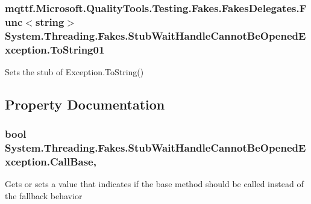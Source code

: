 \hypertarget{class_system_1_1_threading_1_1_fakes_1_1_stub_wait_handle_cannot_be_opened_exception_a64240f025b47e4b791245b3275ce0267}{
\subsubsection[{To\-String01}]{\setlength{\rightskip}{0pt plus 5cm}mqttf.\-Microsoft.\-Quality\-Tools.\-Testing.\-Fakes.\-Fakes\-Delegates.\-Func$<$string$>$ System.\-Threading.\-Fakes.\-Stub\-Wait\-Handle\-Cannot\-Be\-Opened\-Exception.\-To\-String01}}\label{class_system_1_1_threading_1_1_fakes_1_1_stub_wait_handle_cannot_be_opened_exception_a64240f025b47e4b791245b3275ce0267}


Sets the stub of Exception.\-To\-String()



\subsection{Property Documentation}
\hypertarget{class_system_1_1_threading_1_1_fakes_1_1_stub_wait_handle_cannot_be_opened_exception_a8f80b25ebf5f3305b866a31e12d46839}{
\subsubsection[{Call\-Base}]{\setlength{\rightskip}{0pt plus 5cm}bool System.\-Threading.\-Fakes.\-Stub\-Wait\-Handle\-Cannot\-Be\-Opened\-Exception.\-Call\-Base\hspace{0.3cm}{\ttfamily [get]}, {\ttfamily [set]}}}\label{class_system_1_1_threading_1_1_fakes_1_1_stub_wait_handle_cannot_be_opened_exception_a8f80b25ebf5f3305b866a31e12d46839}


Gets or sets a value that indicates if the base method should be called instead of the fallback behavior

